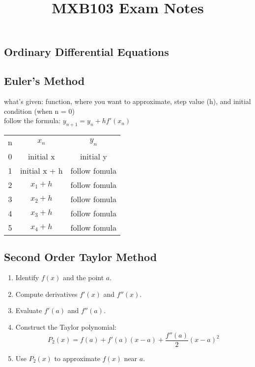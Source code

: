 \documentclass[10pt]{article}
\title{\vspace{-4ex}MXB103 Exam Notes\vspace{-1ex}}
\author{}
\date{}
\begin{document}
\maketitle
\thispagestyle{empty} %

\begin{multicols}{2} %

\section*{Ordinary Differential Equations}
\subsection*{Euler's Method}
what's given: function, where you want to approximate, step value (h), and initial condition (when n = 0)\\
follow the formula: $ y_{n+1} = y_{n} + hf'(x_{n}) $ \\
\begin{tabular}{ c c c }
    n & $ x_{n} $ & $ y_{n} $ \\
    0 & initial x & initial y \\ 
    1 & initial x + h & follow fomula\\
    2 & $ x_{1} + h $ & follow fomula\\
    3 & $ x_{2} + h $ & follow fomula\\
    4 & $ x_{3} + h $ & follow fomula\\
    5 & $ x_{4} + h $ & follow fomula\\
\end{tabular}

\subsection*{Second Order Taylor Method}

\begin{enumerate}
    \item Identify \( f(x) \) and the point \( a \).
    \item Compute derivatives \( f'(x) \) and \( f''(x) \).
    \item Evaluate \( f'(a) \) and \( f''(a) \).
    \item Construct the Taylor polynomial:
    \[ P_2(x) = f(a) + f'(a)(x-a) + \frac{f''(a)}{2}(x-a)^2 \]
    \item Use \( P_2(x) \) to approximate \( f(x) \) near \( a \).
\end{enumerate}




\end{multicols}
\end{document}
